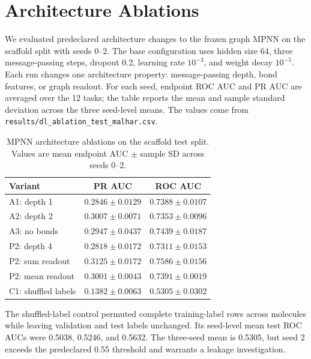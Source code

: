 \section{Architecture Ablations}
\label{sec:malhar-architecture-ablations}

We evaluated predeclared architecture changes to the frozen graph MPNN on the scaffold split with seeds 0--2. The base configuration uses hidden size 64, three message-passing steps, dropout 0.2, learning rate $10^{-3}$, and weight decay $10^{-5}$. Each run changes one architecture property: message-passing depth, bond features, or graph readout. For each seed, endpoint ROC AUC and PR AUC are averaged over the 12 tasks; the table reports the mean and sample standard deviation across the three seed-level means. The values come from \texttt{results/dl\_ablation\_test\_malhar.csv}.

\begin{table}[t]
\centering
\caption{MPNN architecture ablations on the scaffold test split. Values are mean endpoint AUC $\pm$ sample SD across seeds 0--2.}
\label{tab:malhar-architecture-ablations}
\small
\begin{tabular}{lcc}
\toprule
Variant & PR AUC & ROC AUC \\
\midrule
A1: depth 1 & $0.2846 \pm 0.0129$ & $0.7388 \pm 0.0107$ \\
A2: depth 2 & $0.3007 \pm 0.0071$ & $0.7353 \pm 0.0096$ \\
A3: no bonds & $0.2947 \pm 0.0437$ & $0.7439 \pm 0.0187$ \\
P2: depth 4 & $0.2818 \pm 0.0172$ & $0.7311 \pm 0.0153$ \\
P2: sum readout & $0.3125 \pm 0.0172$ & $0.7586 \pm 0.0156$ \\
P2: mean readout & $0.3001 \pm 0.0043$ & $0.7391 \pm 0.0019$ \\
C1: shuffled labels & $0.1382 \pm 0.0063$ & $0.5305 \pm 0.0302$ \\
\bottomrule
\end{tabular}
\end{table}

The shuffled-label control permuted complete training-label rows across molecules while leaving validation and test labels unchanged. Its seed-level mean test ROC AUCs were 0.5038, 0.5246, and 0.5632. The three-seed mean is 0.5305, but seed 2 exceeds the predeclared 0.55 threshold and warrants a leakage investigation.
